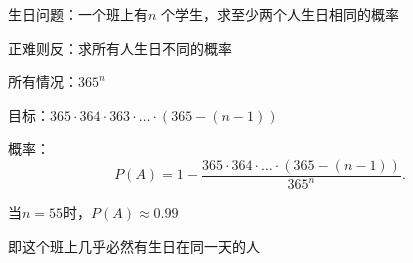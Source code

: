 \begin{eg}
    生日问题：一个班上有$n$ 个学生，求至少两个人生日相同的概率

    正难则反：求所有人生日不同的概率

    所有情况：$365^n$ 

    目标：$365\cdot 364\cdot 363\cdot \ldots\cdot (365-\left( n-1 \right)) $ 

    概率：\[
        P\left( A \right) =1-\frac{365\cdot 364\cdot \ldots\cdot (365-\left( n-1 \right)) }{365^{n}}
    .\]

    当$n=55$时，$P\left( A \right) \approx 0.99$

    即这个班上几乎必然有生日在同一天的人
\end{eg}
